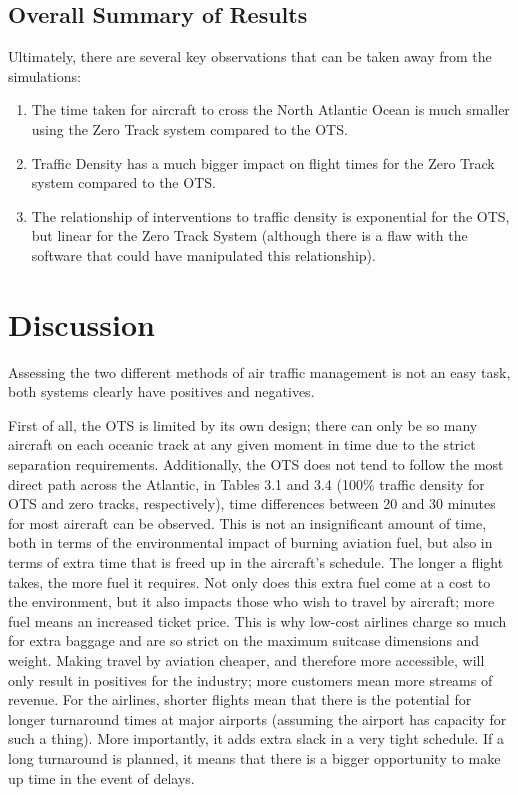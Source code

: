 \documentclass[stu, a4paper, 12pt, floatsintext]{apa7}
\numberwithin{figure}{section}
\numberwithin{table}{section}
\numberwithin{equation}{section}
\begin{document}
\subsection{Overall Summary of Results}
Ultimately, there are several key observations that can be taken away from the simulations:
\begin{enumerate}
    \item The time taken for aircraft to cross the North Atlantic Ocean is much smaller using the Zero Track system compared to the OTS. 
    \item Traffic Density has a much bigger impact on flight times for the Zero Track system compared to the OTS. 
    \item The relationship of interventions to traffic density is exponential for the OTS, but linear for the Zero Track System (although there is a flaw with the software that could have manipulated this relationship). 
\end{enumerate}

\newpage
\section{Discussion}
Assessing the two different methods of air traffic management is not an easy task, both systems clearly have positives and negatives. 

First of all, the OTS is limited by its own design; there can only be so many aircraft on each oceanic track at any given moment in time due to the strict separation requirements. Additionally, the OTS does not tend to follow the most direct path across the Atlantic, in Tables 3.1 and 3.4 (100\% traffic density for OTS and zero tracks, respectively), time differences between 20 and 30 minutes for most aircraft can be observed. This is not an insignificant amount of time, both in terms of the environmental impact of burning aviation fuel, but also in terms of extra time that is freed up in the aircraft’s schedule. The longer a flight takes, the more fuel it requires. Not only does this extra fuel come at a cost to the environment, but it also impacts those who wish to travel by aircraft; more fuel means an increased ticket price. This is why low-cost airlines charge so much for extra baggage and are so strict on the maximum suitcase dimensions and weight. Making travel by aviation cheaper, and therefore more accessible, will only result in positives for the industry; more customers mean more streams of revenue. For the airlines, shorter flights mean that there is the potential for longer turnaround times at major airports (assuming the airport has capacity for such a thing). More importantly, it adds extra slack in a very tight schedule. If a long turnaround is planned, it means that there is a bigger opportunity to make up time in the event of delays. 
\end{document}
